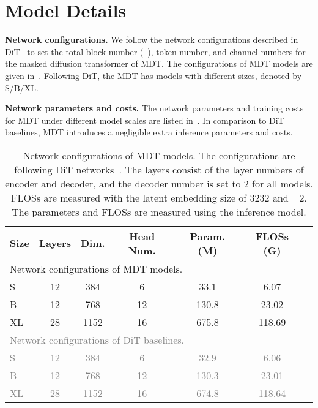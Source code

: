 \documentclass[final]{cvpr}
\newcommand{\myPara}[1]{\vspace{.08in} \noindent\textbf{#1}}
\begin{document}
\section{Model Details}

\myPara{Network configurations.}
We follow the network configurations described in DiT~\cite{peebles2022scalable} to set the total block number (\ie~), 
token number, and channel numbers for the 
masked diffusion transformer of MDT. 
The configurations of MDT models are given in~.
Following DiT, the MDT has models with different sizes, denoted by S/B/XL.



\myPara{Network parameters and costs.}
The network parameters and training costs for MDT under different model scales 
are listed in~. 
In comparison to DiT baselines, 
MDT introduces a negligible extra inference
parameters and costs.

\newcommand{\gr}[1]{\textcolor{gray}{#1}}
\begin{table}[h]
  \centering
  \small
  \setlength{\tabcolsep}{1.6mm} \begin{tabular}{lcccccc}
      \toprule
      Size	 & Layers & Dim. & Head Num. & Param. (M) & FLOSs (G) \\	\midrule
      \multicolumn{6}{l}{Network configurations of MDT models.} \\ \hline
      S  & 12  & 384 & 6 & 33.1  & 6.07  \\               
      B  & 12  & 768 & 12 & 130.8  & 23.02 \\    
      XL & 28  & 1152 & 16 & 675.8 & 118.69  \\    \midrule
      \multicolumn{6}{l}{\gr{Network configurations of DiT baselines.}} \\ \hline
      \gr{S}  & \gr{12}  & \gr{384} & \gr{6} & \gr{32.9}  & \gr{6.06}  \\               
      \gr{B}  & \gr{12}  & \gr{768} & \gr{12} & \gr{130.3}  & \gr{23.01} \\    
      \gr{XL} & \gr{28}  & \gr{1152} & \gr{16} & \gr{674.8} & \gr{118.64}  \\    
      \bottomrule
  \end{tabular}
  \vspace{2pt}
  \caption{Network configurations of MDT models.
  The configurations are following DiT networks~\cite{peebles2022scalable}.
  The layers consist of the layer numbers of encoder and decoder, and the decoder number  is set to 2 for all models.
  FLOSs are measured with the latent embedding size of 3232 and =2.
  The parameters and FLOSs are measured using the inference model.
  \label{tab:model_config}
  }
  \end{table}
\end{document}
